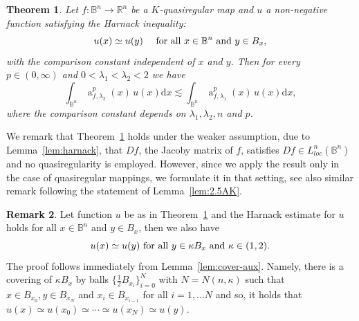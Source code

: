 \documentclass[11pt,a4paper,reqno]{amsart}
\newtheorem{theorem}{Theorem}[section]
\theoremstyle{definition}
\newtheorem{remark}[theorem]{Remark}
\renewcommand{\a}{\operatorname{a}}
\newcommand{\B}{\mathbb{B}^n}
\newcommand{\R}{\mathbb{R}}
\newcommand{\ud}{\mathrm {d}}
\newcommand{\blue}{\color{blau}}
\newcommand{\red}{\color{red}}
\newcounter{komcounter}
\numberwithin{komcounter}{section}
\newcommand{\komT}[1]{{\bf \blue [\refstepcounter{komcounter}\thekomcounter (by T): #1]}}
\newcommand{\komI}[1]{{\bf \red [\refstepcounter{komcounter}\thekomcounter (by I): #1]}}
\begin{document}
\begin{theorem}\label{thm:afintegrability}
Let $f:\B\rightarrow \R^n$ be a $K$-quasiregular map and $u$ a non-negative function satisfying the Harnack inequality:
	\[
	u(x)\simeq u(y)\quad \hbox{ for all } x\in\B \hbox{ and }y\in B_x,
	\]  
	with the comparison constant independent of $x$ and $y$.
%	
	Then for every $p\in (0,\infty )$ and $0<\lambda_1 <\lambda_2<2$ we have
	$$
	 \int_{\B}\a^p_{f,\lambda_2}(x)\,u(x)\ud x \lesssim \int_{\B}\a^p_{f,\lambda_1}(x)\, u(x)\ud x,
	 $$
	where the comparison constant depends on $\lambda_1 ,\lambda_2, n$ and $p$.
\end{theorem}

We remark that Theorem~\ref{thm:afintegrability} holds under the weaker assumption, due to Lemma~\ref{lem:harnack}, that $Df$, the Jacoby matrix of $f$, satisfies ${D\!f \in L^n_{loc}(\B)}$ and no quasiregularity is employed. However, since we apply the result only in the case of quasiregular mappings, we formulate it in that setting, see also similar remark following the statement of Lemma~\ref{lem:2.5AK}.

\begin{remark}\label{u-HI-kappa}
 Let function $u$ be as in Theorem~\ref{thm:afintegrability} and the Harnack estimate for $u$ holds for all $x\in\B$ and $y\in B_x$, then we also have
\[
 u(x)\simeq u(y) \hbox{ for all } y\in\kappa B_x \hbox{ and } \kappa \in (1,2).
\]
The proof follows immediately from Lemma~\ref{lem:cover-aux}. Namely, there is a covering of $\kappa B_x$ by balls $\{ \frac 12 B_{x_i}\}_{i=0}^N$ with $N=N(n,\kappa )$ such that $x\in B_{x_0}, y\in B_{x_N}$ and $x_i\in B_{x_{i-1}}$ for all $i=1,\dots N$  and so, it holds that $u(x)\simeq u(x_0)\simeq\cdots\simeq u(x_N)\simeq u(y)$.
\end{remark}
\end{document}
